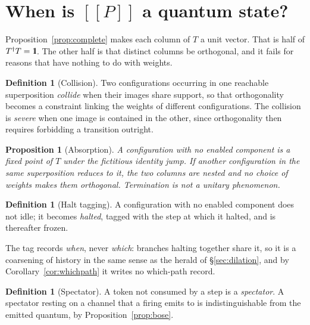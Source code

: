 \documentclass[11pt,a4paper]{article}
\newcommand{\Id}{\mathrm{1}\hspace{-0.30em}\mathrm{l}}
\theoremstyle{plain}
\newtheorem{proposition}[theorem]{Proposition}
\theoremstyle{definition}
\newtheorem{definition}[theorem]{Definition}
\theoremstyle{remark}
\newcommand{\sem}[1]{[\![#1]\!]}
\begin{document}
\section{When is $\sem{P}$ a quantum state?}\label{sec:fragment}

Proposition~\ref{prop:complete} makes each column of $T$ a unit vector. That is
half of $T^{\dagger}T = \Id$. The other half is that distinct columns be
orthogonal, and it fails for reasons that have nothing to do with weights.

\begin{definition}[Collision]\label{def:collision}
Two configurations occurring in one reachable superposition \emph{collide} when
their images share support, so that orthogonality becomes a constraint linking
the weights of different configurations. The collision is \emph{severe} when one
image is contained in the other, since orthogonality then requires forbidding a
transition outright.
\end{definition}

\begin{proposition}[Absorption]\label{prop:absorb}
A configuration with no enabled component is a fixed point of $T$ under the
fictitious identity jump. If another configuration in the same superposition
reduces to it, the two columns are nested and no choice of weights makes them
orthogonal. Termination is not a unitary phenomenon.
\end{proposition}

\begin{definition}[Halt tagging]\label{def:halt}
A configuration with no enabled component does not idle; it becomes
\emph{halted}, tagged with the step at which it halted, and is thereafter
frozen.
\end{definition}

The tag records \emph{when}, never \emph{which}: branches halting together share
it, so it is a coarsening of history in the same sense as the herald of
\S\ref{sec:dilation}, and by Corollary~\ref{cor:whichpath} it writes no
which-path record.

\begin{definition}[Spectator]\label{def:spectator}
A token not consumed by a step is a \emph{spectator}. A spectator resting on a
channel that a firing emits to is indistinguishable from the emitted quantum, by
Proposition~\ref{prop:bose}.
\end{definition}
\end{document}
